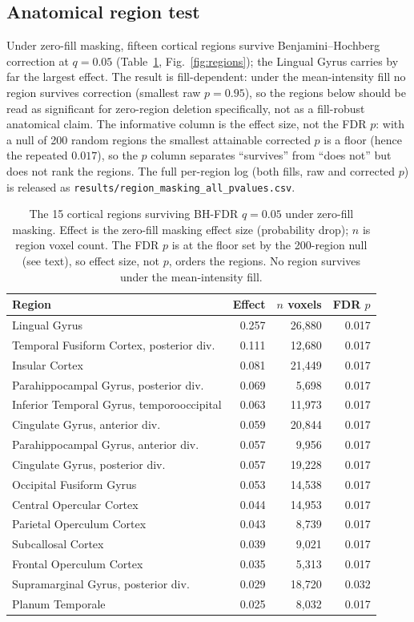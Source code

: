 \documentclass[11pt]{article}
\begin{document}
\subsection{Anatomical region test}
Under zero-fill masking, fifteen cortical regions survive Benjamini--Hochberg correction at
$q=0.05$ (Table~\ref{tab:regions}, Fig.~\ref{fig:regions}); the Lingual Gyrus carries by far
the largest effect. The result is fill-dependent: under the mean-intensity fill no region
survives correction (smallest raw $p=0.95$), so the regions below should be read as
significant for zero-region deletion specifically, not as a fill-robust anatomical claim. The
informative column is the effect size, not the FDR $p$: with a null of 200 random regions the
smallest attainable corrected $p$ is a floor (hence the repeated $0.017$), so the $p$ column
separates ``survives'' from ``does not'' but does not rank the regions. The full per-region
log (both fills, raw and corrected $p$) is released as
\texttt{results/region\_masking\_all\_pvalues.csv}.

\begin{table}[H]
\centering
\caption{The 15 cortical regions surviving BH-FDR $q=0.05$ under zero-fill masking. Effect is
the zero-fill masking effect size (probability drop); $n$ is region voxel count. The FDR $p$
is at the floor set by the 200-region null (see text), so effect size, not $p$, orders the
regions. No region survives under the mean-intensity fill.}
\label{tab:regions}
\small
\begin{tabular}{lrrr}
\toprule
Region & Effect & $n$ voxels & FDR $p$ \\
\midrule
Lingual Gyrus & 0.257 & 26{,}880 & 0.017 \\
Temporal Fusiform Cortex, posterior div. & 0.111 & 12{,}680 & 0.017 \\
Insular Cortex & 0.081 & 21{,}449 & 0.017 \\
Parahippocampal Gyrus, posterior div. & 0.069 & 5{,}698 & 0.017 \\
Inferior Temporal Gyrus, temporooccipital & 0.063 & 11{,}973 & 0.017 \\
Cingulate Gyrus, anterior div. & 0.059 & 20{,}844 & 0.017 \\
Parahippocampal Gyrus, anterior div. & 0.057 & 9{,}956 & 0.017 \\
Cingulate Gyrus, posterior div. & 0.057 & 19{,}228 & 0.017 \\
Occipital Fusiform Gyrus & 0.053 & 14{,}538 & 0.017 \\
Central Opercular Cortex & 0.044 & 14{,}953 & 0.017 \\
Parietal Operculum Cortex & 0.043 & 8{,}739 & 0.017 \\
Subcallosal Cortex & 0.039 & 9{,}021 & 0.017 \\
Frontal Operculum Cortex & 0.035 & 5{,}313 & 0.017 \\
Supramarginal Gyrus, posterior div. & 0.029 & 18{,}720 & 0.032 \\
Planum Temporale & 0.025 & 8{,}032 & 0.017 \\
\bottomrule
\end{tabular}
\end{table}
\end{document}
